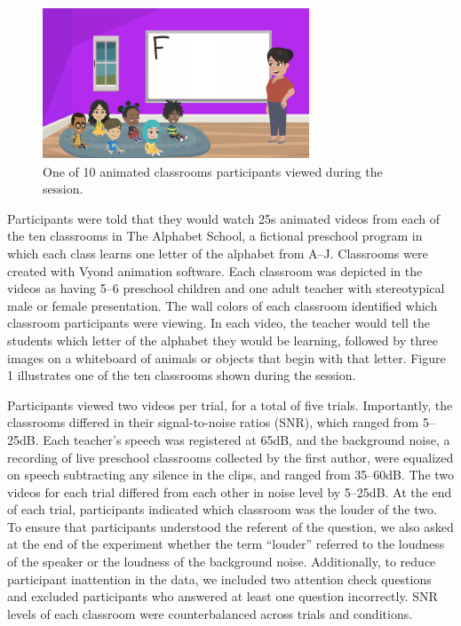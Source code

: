 \documentclass[10pt, letterpaper]{article}
\newenvironment{CodeChunk}{}{}
\begin{document}
\begin{CodeChunk}
\begin{figure}[t]

{\centering \includegraphics{figs/e1-stimuli-1} 

}

\caption[One of 10 animated classrooms participants viewed during the session]{One of 10 animated classrooms participants viewed during the session.}\label{fig:e1-stimuli}
\end{figure}
\end{CodeChunk}

Participants were told that they would watch 25s animated videos from
each of the ten classrooms in The Alphabet School, a fictional preschool
program in which each class learns one letter of the alphabet from A--J.
Classrooms were created with Vyond animation software. Each classroom
was depicted in the videos as having 5--6 preschool children and one
adult teacher with stereotypical male or female presentation. The wall
colors of each classroom identified which classroom participants were
viewing. In each video, the teacher would tell the students which letter
of the alphabet they would be learning, followed by three images on a
whiteboard of animals or objects that begin with that letter. Figure 1
illustrates one of the ten classrooms shown during the session.

Participants viewed two videos per trial, for a total of five trials.
Importantly, the classrooms differed in their signal-to-noise ratios
(SNR), which ranged from 5--25dB. Each teacher's speech was registered
at 65dB, and the background noise, a recording of live preschool
classrooms collected by the first author, were equalized on speech
subtracting any silence in the clips, and ranged from 35--60dB. The two
videos for each trial differed from each other in noise level by
5--25dB. At the end of each trial, participants indicated which
classroom was the louder of the two. To ensure that participants
understood the referent of the question, we also asked at the end of the
experiment whether the term ``louder'' referred to the loudness of the
speaker or the loudness of the background noise. Additionally, to reduce
participant inattention in the data, we included two attention check
questions and excluded participants who answered at least one question
incorrectly. SNR levels of each classroom were counterbalanced across
trials and conditions.
\end{document}
